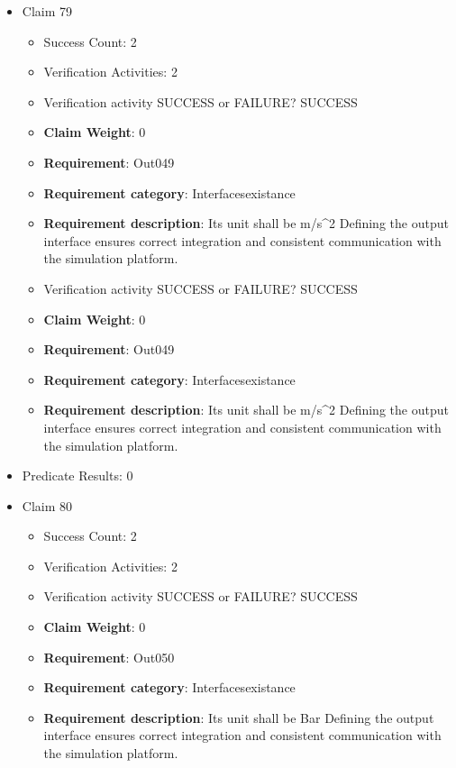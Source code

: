 \documentclass{article}
\begin{document}
\begin{itemize}
  				  \item Claim 79
				\begin{itemize}
			    	\item Success Count: 2 
			    	\item Verification Activities: 2
					\item Verification activity SUCCESS or FAILURE? SUCCESS
					\item \textbf{Claim Weight}: 0
						\item \textbf{Requirement}: Out049 
						\item \textbf{Requirement category}: Interfacesexistance 
						\item \textbf{Requirement description}: Its unit shall be m/s^2 Defining the output interface ensures correct integration and consistent communication with the simulation platform.
					
					\item Verification activity SUCCESS or FAILURE? SUCCESS
					\item \textbf{Claim Weight}: 0
						\item \textbf{Requirement}: Out049 
						\item \textbf{Requirement category}: Interfacesexistance 
						\item \textbf{Requirement description}: Its unit shall be m/s^2 Defining the output interface ensures correct integration and consistent communication with the simulation platform.
					
				\end{itemize}
				
									    
				\item Predicate Results: 0

  				  \item Claim 80
				\begin{itemize}
			    	\item Success Count: 2 
			    	\item Verification Activities: 2
					\item Verification activity SUCCESS or FAILURE? SUCCESS
					\item \textbf{Claim Weight}: 0
						\item \textbf{Requirement}: Out050 
						\item \textbf{Requirement category}: Interfacesexistance 
						\item \textbf{Requirement description}: Its unit shall be Bar Defining the output interface ensures correct integration and consistent communication with the simulation platform.
					

\end{itemize}
\end{itemize}
\end{document}
